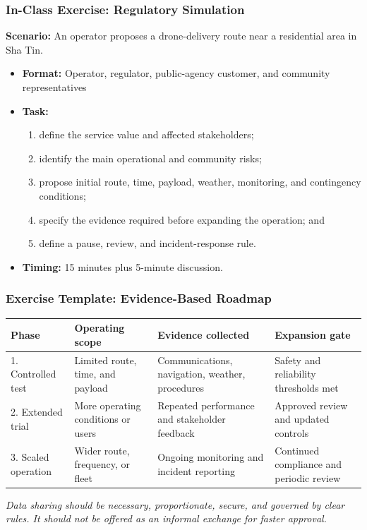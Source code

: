 \documentclass{beamer}
\begin{document}
\begin{frame}[t]
\frametitle{In-Class Exercise: Regulatory Simulation}
\textbf{Scenario:} An operator proposes a drone-delivery route near a residential area in Sha Tin.
\begin{itemize}
\item \textbf{Format:} Operator, regulator, public-agency customer, and community representatives
\item \textbf{Task:}
\begin{enumerate}
\item define the service value and affected stakeholders;
\item identify the main operational and community risks;
\item propose initial route, time, payload, weather, monitoring, and contingency conditions;
\item specify the evidence required before expanding the operation; and
\item define a pause, review, and incident-response rule.
\end{enumerate}
\item \textbf{Timing:} 15 minutes plus 5-minute discussion.
\end{itemize}
\end{frame}

\begin{frame}[t]
\frametitle{Exercise Template: Evidence-Based Roadmap}
\begin{center}\small
\begin{tabular}{p{}|p{}|p{}|p{}}
\textbf{Phase} & \textbf{Operating scope} & \textbf{Evidence collected} & \textbf{Expansion gate}\\
\hline
1. Controlled test & Limited route, time, and payload & Communications, navigation, weather, procedures & Safety and reliability thresholds met\\
2. Extended trial & More operating conditions or users & Repeated performance and stakeholder feedback & Approved review and updated controls\\
3. Scaled operation & Wider route, frequency, or fleet & Ongoing monitoring and incident reporting & Continued compliance and periodic review\\
\end{tabular}
\end{center}
\vspace{0.25cm}
\textit{Data sharing should be necessary, proportionate, secure, and governed by clear rules. It should not be offered as an informal exchange for faster approval.}
\end{frame}
\end{document}
